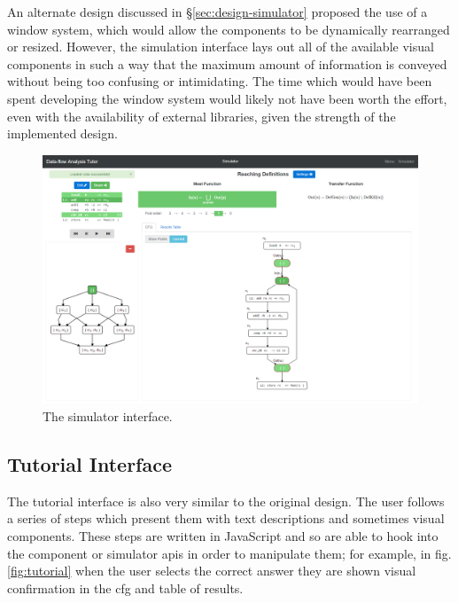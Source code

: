 \documentclass[bsc,twoside,singlespacing,parskip,logo,notimes,normalheadings]{infthesis}
\begin{document}
        An alternate design discussed in \S\ref{sec:design-simulator}
        proposed the use of a window system, which would allow the
        components to be dynamically rearranged or resized. However,
        the simulation interface lays out all of the available visual
        components in such a way that the maximum amount of
        information is conveyed without being too confusing or
        intimidating. The time which would have been spent developing
        the window system would likely not have been worth the effort,
        even with the availability of external libraries, given the
        strength of the implemented design.

        \begin{figure}[p]
          \centering
          \includegraphics[width=\textheight, angle=-90]{img/simulator.png}
          \captionsetup{width=\textwidth, justification=centering}
          \caption{The simulator interface.}\label{fig:simulator}
        \end{figure}

        \subsection{Tutorial Interface}\label{sec:impl-tutorials}
        
        The tutorial interface is also very similar to the original
        design. The user follows a series of steps which present them
        with text descriptions and sometimes visual components. These
        steps are written in JavaScript and so are able to hook into
        the component or simulator \gls{api}s in order to manipulate
        them; for example, in fig. \ref{fig:tutorial} when the user
        selects the correct answer they are shown visual confirmation
        in the \gls{cfg} and table of results.
\end{document}
